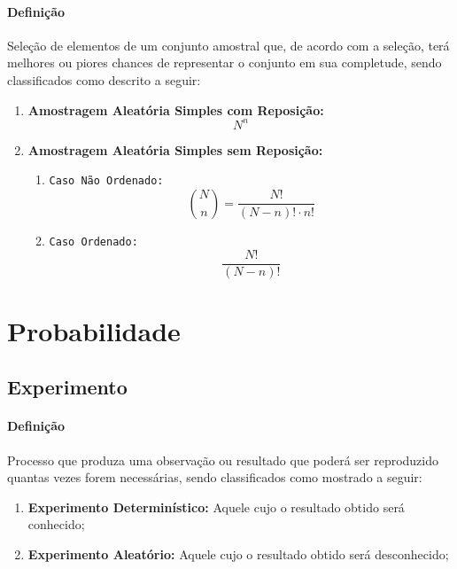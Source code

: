 \documentclass{article}
\begin{document}
            \paragraph{Definição}Seleção de elementos de um conjunto amostral que, de acordo com a seleção, terá melhores ou piores chances de representar o conjunto em sua completude, sendo classificados como descrito a seguir:
                \begin{enumerate}[noitemsep]
                    \item \textbf{Amostragem Aleatória Simples com Reposição:} 
                        \begin{equation}
                            \boxed{
                                N^{n}
                            }
                        \end{equation}
                    \item \textbf{Amostragem Aleatória Simples sem Reposição:} 
                        \begin{enumerate}[noitemsep]
                            \item \texttt{Caso Não Ordenado:} 
                                \begin{equation}
                                    \boxed{
                                        \binom{N}{n} = \frac{N!}{(N-n)! \cdot n!}
                                    }
                                \end{equation}
                            \item \texttt{Caso Ordenado:} 
                                \begin{equation}
                                    \boxed{
                                        \frac{N!}{(N - n)!}
                                    }
                                \end{equation}
                        \end{enumerate}
                \end{enumerate}

\newpage

    \section{Probabilidade}
        \subsection{Experimento}
            \paragraph{Definição}Processo que produza uma observação ou resultado que poderá ser reproduzido quantas vezes forem necessárias, sendo classificados como mostrado a seguir:
                \begin{enumerate}[noitemsep]
                    \item \textbf{Experimento Determinístico:} Aquele cujo o resultado obtido será conhecido;
                    \item \textbf{Experimento Aleatório:} Aquele cujo o resultado obtido será desconhecido;
                \end{enumerate}
\end{document}
